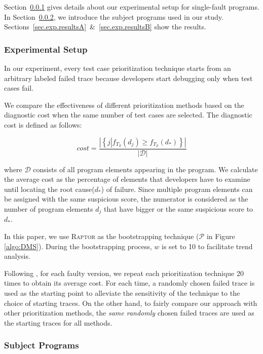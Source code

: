 Section~\ref{sec.exp.setup} gives details about our experimental setup for single-fault programs.
In Section~\ref{sec.exp.subject}, we introduce the subject programs used in our study. Sections~\ref{sec.exp.resultsA}~\&~\ref{sec.exp.resultsB} show the results.

\subsubsection{Experimental Setup}\label{sec.exp.setup}

In our experiment, every test case prioritization technique starts from
an arbitrary labeled failed trace because developers start debugging only when
test cases fail.

We compare the effectiveness of different prioritization methods based on the diagnostic cost when the same number of test cases are selected. The diagnostic cost is defined as follows:

\begin{equation}\label{equation.avgcost}
	cost = \dfrac{\left|  \left\{ j \left| \right. f_{T_{\mathcal{S}}}(d_j) \geq f_{T_{\mathcal{S}}}(d_*) \right\}  \right|}{\left|  \mathcal{D} \right|}
\end{equation}

where $\mathcal{D}$ consists of all program elements appearing in the program.
We calculate the average cost as the percentage of elements that developers have
to examine until locating the root cause($d_*$) of failure. Since multiple
program elements can be assigned with the same suspicious score, the numerator
is considered as the number of program elements $d_j$ that have bigger or the
same suspicious score to $d_*$.

In this paper, we use \textsc{Raptor} as the bootstrapping technique ($\mathcal{P}$ in Figure \ref{algo:DMS}). During the bootstrapping process, $w$ is set to 10 to facilitate trend analysis.

Following \cite{JiangCT11}, for each faulty version, we repeat each prioritization technique 20 times to obtain its average cost. For each time, a randomly chosen failed trace is used as the starting point to alleviate the sensitivity of the technique to the choice of starting traces. On the other hand, to fairly compare our approach with other prioritization methods, the {\em same randomly} chosen failed traces are used as the starting traces for all methods.

\subsubsection{Subject Programs}\label{sec.exp.subject}

